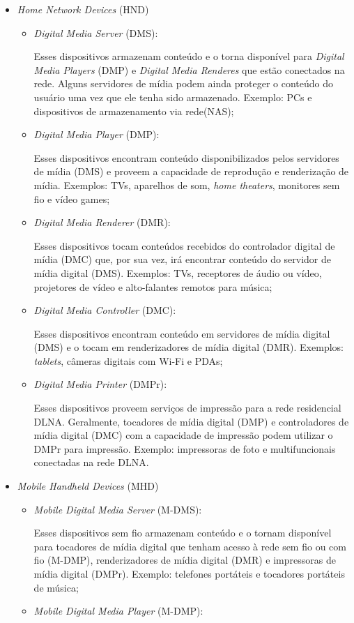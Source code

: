 \begin{itemize}
	\item \emph{Home Network Devices} (HND)
	\begin{itemize}
		\item \emph{Digital Media Server} (DMS): 

		Esses dispositivos armazenam conteúdo e o torna disponível para \emph{Digital Media Players} (DMP) e \emph{Digital Media Renderes} que estão conectados na rede. Alguns servidores de mídia podem ainda proteger o conteúdo do usuário uma vez que ele tenha sido armazenado. Exemplo: PCs e dispositivos de armazenamento via rede(NAS);
		\item \emph{Digital Media Player} (DMP): 

		Esses dispositivos encontram conteúdo disponibilizados pelos servidores de mídia (DMS) e proveem a capacidade de reprodução e renderização de mídia. Exemplos: TVs, aparelhos de som, \emph{home theaters}, monitores sem fio e vídeo games;
		\item \emph{Digital Media Renderer} (DMR): 

		Esses dispositivos tocam conteúdos recebidos do controlador digital de mídia (DMC) que, por sua vez, irá encontrar conteúdo do servidor de mídia digital (DMS). Exemplos: TVs, receptores de áudio ou vídeo, projetores de vídeo e alto-falantes remotos para música;
		\item \emph{Digital Media Controller} (DMC): 

		Esses dispositivos encontram conteúdo em servidores de mídia digital (DMS) e o tocam em renderizadores de mídia digital (DMR). Exemplos: \emph{tablets}, câmeras digitais com Wi-Fi e PDAs;
		\item \emph{Digital Media Printer} (DMPr): 

		Esses dispositivos proveem serviços de impressão para a rede residencial DLNA. Geralmente, tocadores de mídia digital (DMP) e controladores de mídia digital (DMC) com a capacidade de impressão podem utilizar o DMPr para impressão. Exemplo: impressoras de foto e multifuncionais conectadas na rede DLNA.
	\end{itemize}
	\item \emph{Mobile Handheld Devices} (MHD)
	\begin{itemize}
		\item \emph{Mobile Digital Media Server} (M-DMS): 

		Esses dispositivos sem fio armazenam conteúdo e o tornam disponível para tocadores de mídia digital que tenham acesso à rede sem fio ou com fio (M-DMP), renderizadores de mídia digital (DMR) e impressoras de mídia digital (DMPr). Exemplo: telefones portáteis e tocadores portáteis de música;
		\item \emph{Mobile Digital Media Player} (M-DMP): 


\end{itemize}
\end{itemize}
